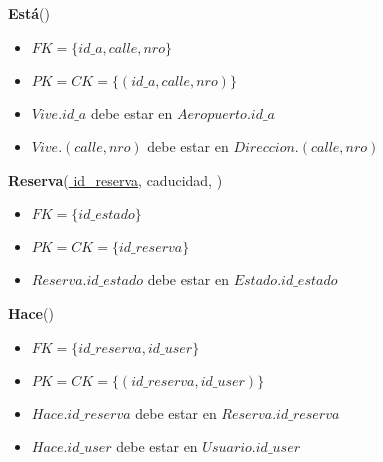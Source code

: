 
\vspace*{0.1cm}
\noindent
\textbf{Está}(\underline{})

\begin{itemize}[noitemsep]
    \item $FK = \{id\_a, calle, nro\}$
    \item $PK = CK = \{(id\_a, calle, nro)\}$
    \item $Vive.id\_a$ debe estar en $Aeropuerto.id\_a$
    \item $Vive.(calle, nro)$ debe estar en $Direccion.(calle, nro)$
\end{itemize}


\vspace*{0.1cm}
\noindent
\textbf{Reserva}(\underline{
	id\_reserva}, 
	caducidad, )

\begin{itemize}[noitemsep]
	\item $FK = \{id\_estado\}$
	\item $PK = CK = \{id\_reserva\}$
	\item $Reserva.id\_estado$ debe estar en $Estado.id\_estado$
\end{itemize}


\newpage
\vspace*{0.1cm}
\noindent
\textbf{Hace}(\underline{})

\begin{itemize}[noitemsep]
	\item $FK = \{id\_reserva, id\_user\}$
	\item $PK = CK = \{(id\_reserva, id\_user)\}$
	\item $Hace.id\_reserva$ debe estar en $Reserva.id\_reserva$
	\item $Hace.id\_user$ debe estar en $Usuario.id\_user$
\end{itemize}


